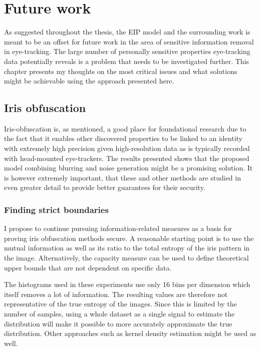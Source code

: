 \chapter{Future work}
As suggested throughout the thesis, the EIP model and the surrounding work is meant to be an offset for future work in the area of sensitive information removal in eye-tracking. The large number of personally sensitive properties eye-tracking data potentially reveals is a problem that needs to be investigated further. This chapter presents my thoughts on the most critical issues and what solutions might be achievable using the approach presented here.



\section{Iris obfuscation}
Iris-obfuscation is, as mentioned, a good place for foundational research due to the fact that it enables other discovered properties to be linked to an identity with extremely high precision given high-resolution data as is typically recorded with head-mounted eye-trackers. The results presented shows that the proposed model combining blurring and noise generation might be a promising solution. It is however extremely important, that these and other methods are studied in even greater detail to provide better guarantees for their security. 


\subsection{Finding strict boundaries}
I propose to continue pursuing information-related measures as a basis for proving iris obfuscation methods secure. A reasonable starting point is to use the mutual information as well as its ratio to the total entropy of the iris pattern in the image. Alternatively, the capacity measure can be used to define theoretical upper bounds that are not dependent on specific data.

The histograms used in these experiments use only 16 bins per dimension which itself removes a lot of information. The resulting values are therefore not representative of the true entropy of the images. Since this is limited by the number of samples, using a whole dataset as a single signal to estimate the distribution will make it possible to more accurately approximate the true distribution. Other approaches such as kernel density estimation might be used as well.

